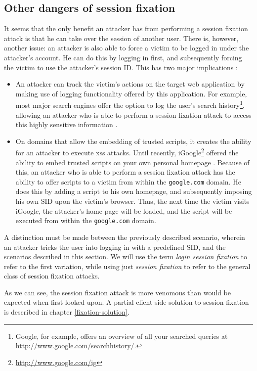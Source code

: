 \subsection{Other dangers of session fixation}

It seems that the only benefit an attacker has from performing a session fixation attack is that he can take over the session of another user. There is, however, another issue: an attacker is also able to force a victim to be logged in under the attacker's account. He can do this by logging in first, and subsequently forcing the victim to use the attacker's session ID. This has two major implications \cite{Barth2008}:
\begin{itemize}
	\item An attacker can track the victim's actions on the target web application by making use of logging functionality offered by this application. For example, most major search engines offer the option to log the user's search history\footnote{Google, for example, offers an overview of all your searched queries at \url{http://www.google.com/searchhistory/}.}, allowing an attacker who is able to perform a session fixation attack to access this highly sensitive information \cite{Barbaro2006}.
	\item On domains that allow the embedding of trusted scripts, it creates the ability for an attacker to execute \gls{xss} attacks. Until recently, iGoogle\footnote{\url{http://www.google.com/ig}} offered the ability to embed trusted scripts on your own personal homepage \cite{Barth2008}. Because of this, an attacker who is able to perform a session fixation attack has the ability to offer scripts to a victim from within the \texttt{google.com} domain. He does this by adding a script to his own homepage, and subsequently imposing his own SID upon the victim's browser. Thus, the next time the victim visits iGoogle, the attacker's home page will be loaded, and the script will be executed from within the \texttt{google.com} domain.
\end{itemize}
A distinction must be made between the previously described scenario, wherein an attacker tricks the user into logging in with a predefined SID, and the scenarios described in this section. We will use the term \emph{\gls{login session fixation}} to refer to the first variation, while using just \emph{session fixation} to refer to the general class of session fixation attacks.

As we can see, the session fixation attack is more venomous than would be expected when first looked upon. A partial client-side solution to session fixation is described in chapter \ref{fixation-solution}.

